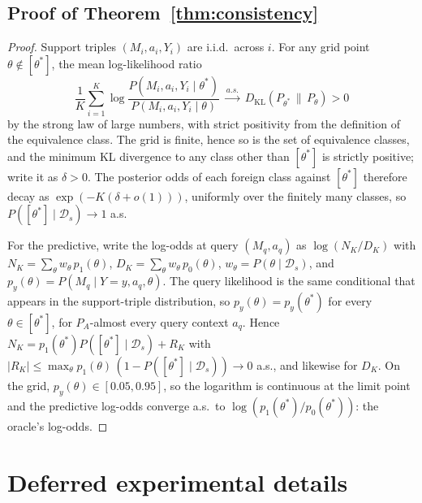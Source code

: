 \subsection{Proof of Theorem~\ref{thm:consistency}}
\begin{proof}
Support triples $(M_i, a_i, Y_i)$ are i.i.d.\ across $i$. For any grid
point $\theta \notin [\theta^*]$, the mean log-likelihood ratio
\[
\frac{1}{K}\sum_{i=1}^K
\log\frac{P(M_i, a_i, Y_i \mid \theta^*)}{P(M_i, a_i, Y_i \mid \theta)}
\;\xrightarrow{a.s.}\;
D_{\mathrm{KL}}(P_{\theta^*} \,\|\, P_{\theta}) > 0
\]
by the strong law of large numbers, with strict positivity from the
definition of the equivalence class. The grid is finite, hence so is the
set of equivalence classes, and the minimum KL divergence to any class
other than $[\theta^*]$ is strictly positive; write it as
$\delta > 0$. The posterior
odds of each foreign class against $[\theta^*]$ therefore decay as
$\exp(-K(\delta + o(1)))$, uniformly over the finitely many classes, so
$P([\theta^*] \mid \mathcal{D}_s) \to 1$ a.s.

For the predictive, write the log-odds at query $(M_q, a_q)$ as
$\log(N_K / D_K)$ with $N_K = \sum_\theta w_\theta\, p_1(\theta)$,
$D_K = \sum_\theta w_\theta\, p_0(\theta)$,
$w_\theta = P(\theta \mid \mathcal{D}_s)$, and
$p_y(\theta) = P(M_q \mid Y = y, a_q, \theta)$.
The query likelihood is the same conditional that appears in the
support-triple distribution, so $p_y(\theta) = p_y(\theta^*)$ for every
$\theta \in [\theta^*]$, for $P_A$-almost every query context $a_q$.
Hence $N_K = p_1(\theta^*) P([\theta^*] \mid \mathcal{D}_s) + R_K$ with
$|R_K| \le \max_\theta p_1(\theta)\,(1 - P([\theta^*] \mid \mathcal{D}_s))
\to 0$ a.s., and likewise for $D_K$. On the grid,
$p_y(\theta) \in [0.05, 0.95]$, so the logarithm is continuous at the
limit point and the predictive log-odds converge a.s.\ to
$\log(p_1(\theta^*)/p_0(\theta^*))$: the oracle's log-odds.
\end{proof}

\section{Deferred experimental details}
\label{app:deferred-exp}

